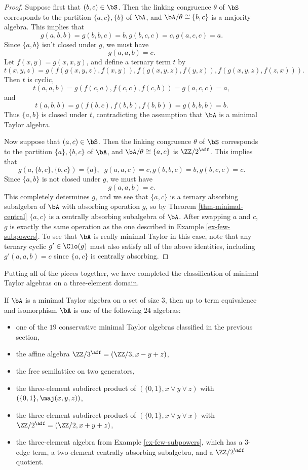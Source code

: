 \begin{proof}
Suppose first that $(b,c) \in \bS$. Then the linking congruence $\theta$ of $\bS$ corresponds to the partition $\{a,c\},\{b\}$ of $\bA$, and $\bA/\theta \cong \{b,c\}$ is a majority algebra. This implies that
\[
g(a,b,b) = g(b,b,c) = b, g(b,c,c) = c, g(a,c,c) = a.
\]
Since $\{a,b\}$ isn't closed under $g$, we must have
\[
g(a,a,b) = c.
\]
Let $f(x,y) = g(x,x,y)$, and define a ternary term $t$ by
\[
t(x,y,z) = g(f(g(x,y,z),f(x,y)),f(g(x,y,z),f(y,z)),f(g(x,y,z),f(z,x))).
\]
Then $t$ is cyclic,
\[
t(a,a,b) = g(f(c,a),f(c,c),f(c,b)) = g(a,c,c) = a,
\]
and
\[
t(a,b,b) = g(f(b,c),f(b,b),f(b,b)) = g(b,b,b) = b.
\]
Thus $\{a,b\}$ is closed under $t$, contradicting the assumption that $\bA$ is a minimal Taylor algebra.

Now suppose that $(a,c) \in \bS$. Then the linking congruence $\theta$ of $\bS$ corresponds to the partition $\{a\},\{b,c\}$ of $\bA$, and $\bA/\theta \cong \{a,c\}$ is $\ZZ/2^{\aff}$. This implies that
\[
g(a,\{b,c\},\{b,c\}) = \{a\}, \;\; g(a,a,c) = c, g(b,b,c) = b, g(b,c,c) = c.
\]
Since $\{a,b\}$ is not closed under $g$, we must have
\[
g(a,a,b) = c.
\]
This completely determines $g$, and we see that $\{a,c\}$ is a ternary absorbing subalgebra of $\bA$ with absorbing operation $g$, so by Theorem \ref{thm-minimal-central} $\{a,c\}$ is a centrally absorbing subalgebra of $\bA$. After swapping $a$ and $c$, $g$ is exactly the same operation as the one described in Example \ref{ex-few-subpowers}. To see that $\bA$ is really minimal Taylor in this case, note that any ternary cyclic $g' \in \Clo(g)$ must also satisfy all of the above identities, including $g'(a,a,b) = c$ since $\{a,c\}$ is centrally absorbing.
\end{proof}

Putting all of the pieces together, we have completed the classification of minimal Taylor algebras on a three-element domain.

\begin{thm} If $\bA$ is a minimal Taylor algebra on a set of size $3$, then up to term equivalence and isomorphism $\bA$ is one of the following $24$ algebras:
\begin{itemize}
\item one of the $19$ conservative minimal Taylor algebras classified in the previous section,
\item the affine algebra $\ZZ/3^{\aff} = (\ZZ/3, x-y+z)$,
\item the free semilattice on two generators,
\item the three-element subdirect product of $(\{0,1\},x\vee y\vee z)$ with $(\{0,1\}, \maj(x,y,z))$,
\item the three-element subdirect product of $(\{0,1\},x\vee y\vee x)$ with $\ZZ/2^{\aff} = (\ZZ/2, x+y+z)$,
\item the three-element algebra from Example \ref{ex-few-subpowers}, which has a $3$-edge term, a two-element centrally absorbing subalgebra, and a $\ZZ/2^{\aff}$ quotient.
\end{itemize}
\end{thm}

